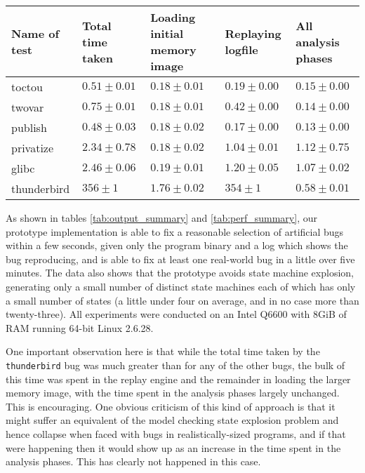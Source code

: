 \documentclass[10pt,twocolumn,preprint,natbib,authoryear]{sigplanconf}
\begin{document}
\begin{table*}
\begin{tabular}{lllll}
Name of test & Total time taken & Loading initial memory image & Replaying logfile & All analysis phases \\ \hline
toctou       & $ 0.51 \pm 0.01$ & $ 0.18 \pm 0.01$     & $ 0.19 \pm 0.00$ & $ 0.15 \pm 0.00$\\
twovar       & $ 0.75 \pm 0.01$ & $ 0.18 \pm 0.01$     & $ 0.42 \pm 0.00$ & $ 0.14 \pm 0.00$\\
publish      & $ 0.48 \pm 0.03$ & $ 0.18 \pm 0.02$     & $ 0.17 \pm 0.00$ & $ 0.13 \pm 0.00$\\
privatize    & $ 2.34 \pm 0.78$ & $ 0.18 \pm 0.02$     & $ 1.04 \pm 0.01$ & $ 1.12 \pm 0.75$\\
\hline
glibc        & $ 2.46 \pm 0.06$ & $ 0.19 \pm 0.01$     & $ 1.20 \pm 0.05$ & $ 1.07 \pm 0.02$\\
\hline
thunderbird  & $ 356  \pm 1$    & $ 1.76 \pm 0.02$     & $ 354  \pm 1$    & $ 0.58 \pm 0.01$\\
\end{tabular}
\caption{Time taken for the various phases of operation, in seconds.
  Mean and standard deviation of analysing a single reproduction five
  times.}
\label{tab:perf_summary}
\end{table*}

As shown in tables \ref{tab:output_summary} and
\ref{tab:perf_summary}, our prototype implementation is able to fix a
reasonable selection of artificial bugs within a few seconds, given
only the program binary and a log which shows the bug reproducing, and
is able to fix at least one real-world bug in a little over five
minutes.  The data also shows that the prototype avoids state machine
explosion, generating only a small number of distinct state machines
each of which has only a small number of states (a little under four
on average, and in no case more than twenty-three).  All experiments
were conducted on an Intel Q6600 with 8GiB of RAM running 64-bit Linux
2.6.28.

One important observation here is that while the total time taken by
the \verb|thunderbird| bug was much greater than for any of the other
bugs, the bulk of this time was spent in the replay engine and the
remainder in loading the larger memory image, with the time spent in
the analysis phases largely unchanged.  This is encouraging.  One
obvious criticism of this kind of approach is that it might suffer an
equivalent of the model checking state explosion problem and hence
collapse when faced with bugs in realistically-sized programs, and if
that were happening then it would show up as an increase in the time
spent in the analysis phases.  This has clearly not happened in this
case.
\end{document}
